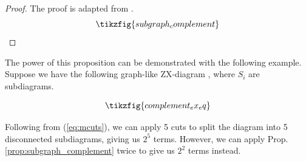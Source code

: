 \begin{proof}
    The proof is adapted from \cite{Codsi2022}.
\begin{equation}
    \tikzfig{subgraph_complement}
\end{equation}
\end{proof}

\clearpage
The power of this proposition can be demonstrated with the following example.
Suppose we have the following graph-like ZX-diagram  \cite{sutcliffe2024part}, 
where $S_i$ are subdiagrams.

\begin{equation}
    \tikzfig{complement_ex_eq}
\end{equation}

Following from (\ref{eq:mcuts}), we can apply 5 cuts to split the diagram into 5 disconnected subdiagrams,
giving us $2^5$ terms.
However, we can apply Prop. \ref{prop:subgraph_complement} twice to give us $2^2$ terms instead.

